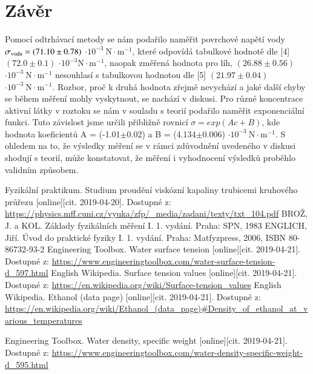 \documentclass[a4paper]{article}
\begin{document}
\section*{Závěr}
\par Pomocí odtrhávací metody se nám podařilo naměřit povrchové napětí vody $\sigma_{\textnormal{voda}} = (71.10\pm0.78)$ $\cdot 10^{-3} \:  \mathrm {N \cdot m^{-1}}$, které odpovídá tabulkové hodnotě dle [4] $(72.0\pm0.1)$ $\cdot 10^{-3} \mathrm{N \cdot m^{-1}}$, naopak změřená hodnota pro líh, $(26.88\pm0.56)$ $\cdot 10^{-3} \:  \mathrm {N \cdot m^{-1}}$ nesouhlasí s tabulkovou hodnotou dle [5] $(21.97\pm0.04)$ $\cdot 10^{-3} \:  \mathrm {N \cdot m^{-1}}$. Rozbor, proč k druhá hodnota zřejmě nevychází a jaké další chyby se během měření mohly vyskytnout, se nachází v diskusi. Pro různé koncentrace aktivní látky v roztoku se nám v souladu s teorií podařilo naměřit exponenciální funkci. Tuto závislost jsme určili přibližně rovnicí $\sigma = exp(Ac+B)$, kde hodnota koeficientů A = (-1.01$\pm$0.02) a B = (4.134$\pm$0.006) $\cdot 10^{-3} \:  \mathrm {N \cdot m^{-1}}$. S ohledem na to, že výsledky měření se v rámci zdůvodnění uvedeného v diskusi shodují s teorií, může konstatovat, že měření i vyhodnocení výsledků proběhlo validním způsobem.
\renewcommand\refname{Použitá literatura}
\begin{thebibliography}{}
Fyzikální praktikum. Studium proudění viskózní kapaliny trubicemi kruhového
průřezu [online][cit. 2019-04-20]. Dostupné z:
\url{https://physics.mff.cuni.cz/vyuka/zfp/_media/zadani/texty/txt_104.pdf}
BROŽ, J. a KOL. Základy fyzikálních měření I. 1. vydání. Praha: SPN, 1983
ENGLICH, Jiří. Úvod do praktické fyziky I. 1. vydání. Praha: Matfyzpress, 2006, ISBN 80-86732-93-2
Engineering Toolbox. Water surface tension [online][cit. 2019-04-21]. Dostupné z:
\url{https://www.engineeringtoolbox.com/water-surface-tension-d_597.html}
English Wikipedia. Surface tension values [online][cit. 2019-04-21]. Dostupné z:
\url{https://en.wikipedia.org/wiki/Surface-tension_values}
English Wikipedia. Ethanol (data page) [online][cit. 2019-04-21]. Dostupné z:
\url{https://en.wikipedia.org/wiki/Ethanol_(data_page)#Density_of_ethanol_at_various_temperatures}

Engineering Toolbox. Water density, specific weight [online][cit. 2019-04-21]. Dostupné z:
\url{https://www.engineeringtoolbox.com/water-density-specific-weight-d_595.html}
\end{thebibliography}
\end{document}
